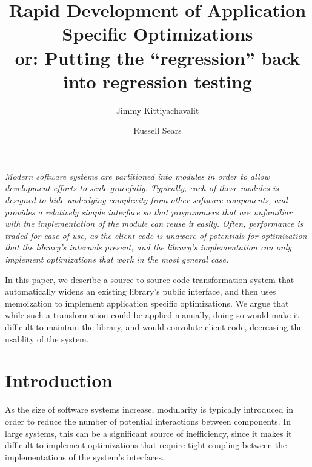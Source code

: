 \documentclass[10pt,letterpaper,twocolumn,english]{article}
\begin{document}
\title{\vspace*{-36pt}Rapid Development of Application Specific Optimizations\\
\vspace*{9pt}
\large{or: Putting the ``regression'' back into regression testing}}
\author{Jimmy Kittiyachavalit \and Russell Sears}
\maketitle




{\em 
Modern software systems are partitioned into modules in order to allow
development efforts to scale gracefully.  Typically, each of these
modules is designed to hide underlying complexity from other software
components, and provides a relatively simple interface so that
programmers that are unfamiliar with the implementation of the module
can reuse it easily. Often, performance is traded for ease of use, as
the client code is unaware of potentials for optimization that the
library's internals present, and the library's implementation can only
implement optimizations that work in the most general case.

In this paper, we describe a source to source code transformation
system that automatically widens an existing library's public
interface, and then uses memoization to implement application specific
optimizations.  We argue that while such a transformation could be
applied manually, doing so would make it difficult to maintain the
library, and would convolute client code, decreasing the usablity of
the system.
}


\section{Introduction}
\label {intro}

As the size of software systems increase, modularity is typically
introduced in order to reduce the number of potential interactions
between components.  In large systems, this can be a significant
source of inefficiency, since it makes it difficult to implement
optimizations that require tight coupling between the implementations
of the system's interfaces.
\end{document}
